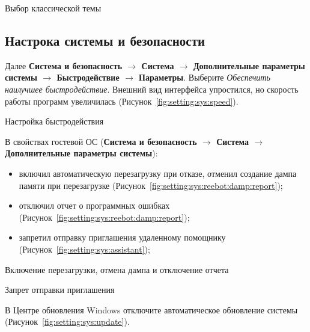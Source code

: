 \begin{image}
	\caption{Выбор классической темы}
	\label{fig:setting:personalization:theme}
\end{image}

\clearpage

\subsection{Настрока системы и безопасности}

Далее \textbf{Система и безопасность $\rightarrow$ Система $\rightarrow$
Дополнительные параметры системы $\rightarrow$
Быстродействие $\rightarrow$ Параметры}.
Выберите \textit{Обеспечить наилучшее быстродействие}.
Внешний вид интерфейса упростился, но скорость работы программ увеличилась
(Рисунок~\ref{fig:setting:sys:speed}).

\begin{image}
	\caption{Настройка быстродействия}
	\label{fig:setting:sys:speed}
\end{image}


В свойствах гостевой ОС
(\textbf{Система и безопасность $\rightarrow$ Система
$\rightarrow$ Дополнительные параметры системы}):

\begin{itemize}
	\item включил автоматическую перезагрузку при отказе,
		отменил создание дампа памяти при перезагрузке
		(Рисунок~\ref{fig:setting:sys:reebot:damp:report});
	\item отключил отчет о программных ошибках
		(Рисунок~\ref{fig:setting:sys:reebot:damp:report});
	\item запретил отправку приглашения удаленному помощнику
		(Рисунок~\ref{fig:setting:sys:assistant});
\end{itemize}

\begin{image}
	\caption{Включение перезагрузки, отмена дампа и отключение отчета}
	\label{fig:setting:sys:reebot:damp:report}
\end{image}

\begin{image}
	\caption{Запрет отправки приглашения}
	\label{fig:setting:sys:assistant}
\end{image}

В Центре обновления Windows отключите автоматическое обновление системы
(Рисунок~\ref{fig:setting:sys:update}).

